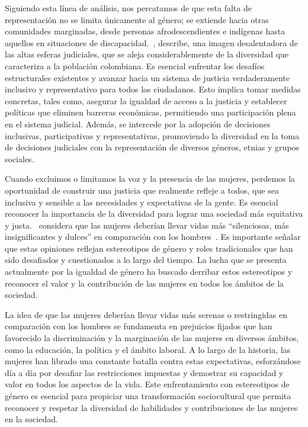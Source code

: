 \documentclass[letterpaper, 12pt]{article}
\begin{document}
Siguiendo esta línea de análisis, nos percatamos de que
esta falta de representación no se limita únicamente al
género; se extiende hacia otras comunidades marginadas,
desde personas afrodescendientes e indígenas hasta aquellos
en situaciones de discapacidad.~\textcite{Gomez_Mazo},
describe, una imagen desalentadora de las altas esferas
judiciales, que se aleja considerablemente de la diversidad
que caracteriza a la población colombiana. Es esencial
enfrentar los desafíos estructurales existentes y avanzar
hacia un sistema de justicia verdaderamente inclusivo y
representativo para todos los ciudadanos. Esto implica
tomar medidas concretas, tales como, asegurar la igualdad
de acceso a la justicia y establecer políticas que eliminen
barreras económicas, permitiendo una participación plena en
el sistema judicial. Además, se intercede por la adopción
de decisiones inclusivas, participativas y representativas,
promoviendo la diversidad en la toma de decisiones
judiciales con la representación de diversos géneros,
etnias y grupos sociales.

Cuando excluimos o limitamos la voz y la presencia de las
mujeres, perdemos la oportunidad de construir una justicia
que realmente refleje a todos, que sea inclusiva y sensible
a las necesidades y expectativas de la gente. Es esencial
reconocer la importancia de la diversidad para lograr una
sociedad más equitativa y justa.~\textcite{schopenhauer}
considera que las mujeres deberían llevar vidas más
``silenciosas, más insignificantes y dulces'' en
comparación con los hombres~\parencite[Fuente original]{Dejusticia_2023_MariaAdelaida}. Es
importante señalar que estas opiniones reflejan
estereotipos de género y roles tradicionales que han sido
desafiados y cuestionados a lo largo del tiempo. La lucha
que se presenta actualmente por la igualdad de género ha
buscado derribar estos estereotipos y reconocer el valor y
la contribución de las mujeres en todos los ámbitos de la
sociedad.

La idea de que las mujeres deberían llevar vidas más
serenas o restringidas en comparación con los hombres se
fundamenta en prejuicios fijados que han favorecido la
discriminación y la marginación de las mujeres en diversos
ámbitos, como la educación, la política y el ámbito
laboral. A lo largo de la historia, las mujeres han librado
una constante batalla contra estas expectativas,
esforzándose día a día por desafiar las restricciones
impuestas y demostrar su capacidad y valor en todos los
aspectos de la vida. Este enfrentamiento con estereotipos
de género es esencial para propiciar una transformación
sociocultural que permita reconocer y respetar la
diversidad de habilidades y contribuciones de las mujeres
en la sociedad.
\end{document}
